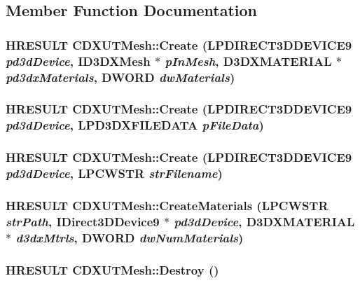 \subsection{Member Function Documentation}
\hypertarget{class_c_d_x_u_t_mesh_ad7ffbc6b3d825dff6ca53ae0dbb2f6a1}{
\subsubsection[{Create}]{\setlength{\rightskip}{0pt plus 5cm}HRESULT CDXUTMesh::Create (LPDIRECT3DDEVICE9 {\em pd3dDevice}, \/  ID3DXMesh $\ast$ {\em pInMesh}, \/  D3DXMATERIAL $\ast$ {\em pd3dxMaterials}, \/  DWORD {\em dwMaterials})}}
\label{class_c_d_x_u_t_mesh_ad7ffbc6b3d825dff6ca53ae0dbb2f6a1}
\hypertarget{class_c_d_x_u_t_mesh_ae29182e3156de207f02c10f6517fc525}{
\subsubsection[{Create}]{\setlength{\rightskip}{0pt plus 5cm}HRESULT CDXUTMesh::Create (LPDIRECT3DDEVICE9 {\em pd3dDevice}, \/  LPD3DXFILEDATA {\em pFileData})}}
\label{class_c_d_x_u_t_mesh_ae29182e3156de207f02c10f6517fc525}
\hypertarget{class_c_d_x_u_t_mesh_ad615a48d94e00ac0b84748218dee4182}{
\subsubsection[{Create}]{\setlength{\rightskip}{0pt plus 5cm}HRESULT CDXUTMesh::Create (LPDIRECT3DDEVICE9 {\em pd3dDevice}, \/  LPCWSTR {\em strFilename})}}
\label{class_c_d_x_u_t_mesh_ad615a48d94e00ac0b84748218dee4182}
\hypertarget{class_c_d_x_u_t_mesh_afe9dd1a0833b0d0b0df3fc0b72695e43}{
\subsubsection[{CreateMaterials}]{\setlength{\rightskip}{0pt plus 5cm}HRESULT CDXUTMesh::CreateMaterials (LPCWSTR {\em strPath}, \/  IDirect3DDevice9 $\ast$ {\em pd3dDevice}, \/  D3DXMATERIAL $\ast$ {\em d3dxMtrls}, \/  DWORD {\em dwNumMaterials})}}
\label{class_c_d_x_u_t_mesh_afe9dd1a0833b0d0b0df3fc0b72695e43}
\hypertarget{class_c_d_x_u_t_mesh_ac19a8633a52a8075495c315e39c22c51}{
\subsubsection[{Destroy}]{\setlength{\rightskip}{0pt plus 5cm}HRESULT CDXUTMesh::Destroy ()}}
